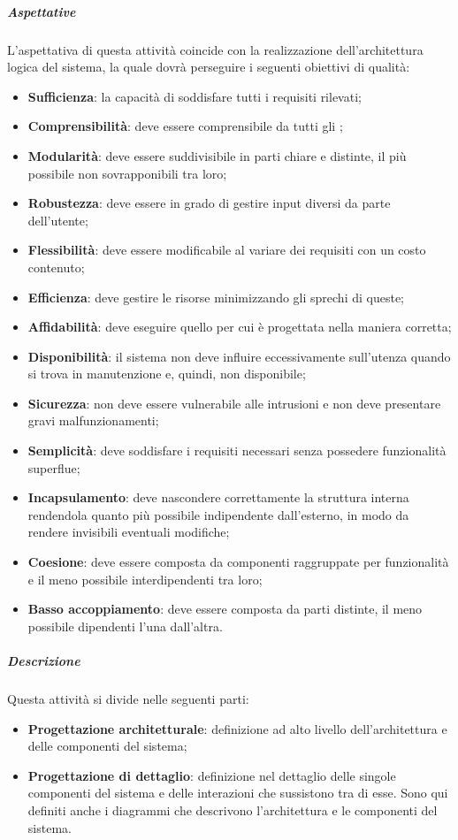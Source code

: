 \documentclass[../norme-di-progetto.tex]{subfiles}
\begin{document}
\subparagraph{Aspettative}
L'aspettativa di questa attività coincide con la realizzazione dell'architettura logica del sistema, la quale dovrà perseguire i seguenti obiettivi di qualità:
\begin{itemize}
  \item \textbf{Sufficienza}: la capacità di soddisfare tutti i requisiti rilevati;
  \item \textbf{Comprensibilità}: deve essere comprensibile da tutti gli ;
  \item \textbf{Modularità}: deve essere suddivisibile in parti chiare e distinte, il più possibile non sovrapponibili tra loro;
  \item \textbf{Robustezza}: deve essere in grado di gestire input diversi da parte dell'utente;
  \item \textbf{Flessibilità}: deve essere modificabile al variare dei requisiti con un costo contenuto;
  \item \textbf{Efficienza}: deve gestire le risorse minimizzando gli sprechi di queste;
  \item \textbf{Affidabilità}: deve eseguire quello per cui è progettata nella maniera corretta;
  \item \textbf{Disponibilità}: il sistema non deve influire eccessivamente sull'utenza quando si trova in manutenzione e, quindi, non disponibile;
  \item \textbf{Sicurezza}: non deve essere vulnerabile alle intrusioni e non deve presentare gravi malfunzionamenti;
  \item \textbf{Semplicità}: deve soddisfare i requisiti necessari senza possedere funzionalità superflue;
  \item \textbf{Incapsulamento}: deve nascondere correttamente la struttura interna rendendola quanto più possibile indipendente dall'esterno, in modo da rendere invisibili eventuali modifiche;
  \item \textbf{Coesione}: deve essere composta da componenti raggruppate per funzionalità e il meno possibile interdipendenti tra loro;
  \item \textbf{Basso accoppiamento}: deve essere composta da parti distinte, il meno possibile dipendenti l'una dall'altra.
\end{itemize}

\subparagraph{Descrizione}
Questa attività si divide nelle seguenti parti:
\begin{itemize}
  \item \textbf{Progettazione architetturale}: definizione ad alto livello dell'architettura e delle componenti del sistema;
  \item \textbf{Progettazione di dettaglio}: definizione nel dettaglio delle singole componenti del sistema e delle interazioni che sussistono tra di esse. Sono qui definiti anche i diagrammi che descrivono l'architettura e le componenti del sistema.
\end{itemize}
\end{document}
